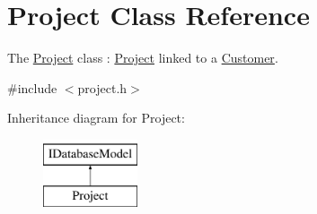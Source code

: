 \hypertarget{classProject}{\section{Project Class Reference}
\label{classProject}
}


The \hyperlink{classProject}{Project} class \-: \hyperlink{classProject}{Project} linked to a \hyperlink{classCustomer}{Customer}.  




{\ttfamily \#include $<$project.\-h$>$}

Inheritance diagram for Project\-:\begin{figure}[H]
\begin{center}
\leavevmode
\includegraphics[height=2.000000cm]{db/d91/classProject}
\end{center}
\end{figure}

